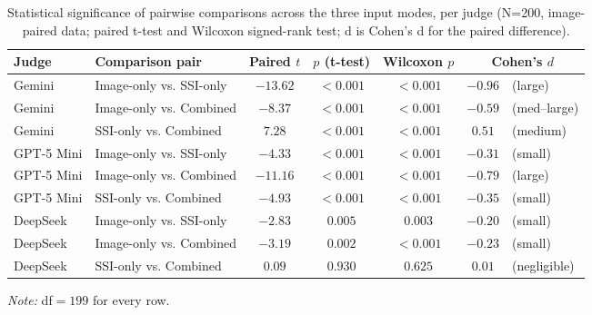 \documentclass[12pt,a4paper]{report}
\begin{document}
\begin{table}[htbp]
    \centering
    \footnotesize
    \caption[Statistical significance of pairwise comparisons across the three input modes]{Statistical significance of pairwise comparisons across the three input modes, per judge (N=200, image-paired data; paired t-test and Wilcoxon signed-rank test; d is Cohen's d for the paired difference).}
    \label{tab:4.6}
    \begin{tabular}{@{}llccccl@{}}
        \toprule
        \textbf{Judge} & \textbf{Comparison pair} & \textbf{Paired $t$} & \textbf{$p$ (t-test)} & \textbf{Wilcoxon $p$} & \multicolumn{2}{c}{\textbf{Cohen's $d$}} \\
        \midrule
        Gemini      & Image-only vs. SSI-only         & $-13.62$ & $<0.001$ & $<0.001$ & $-0.96$ & (large) \\
        Gemini      & Image-only vs. Combined   & $-8.37$  & $<0.001$ & $<0.001$ & $-0.59$ & (med--large) \\
        Gemini      & SSI-only vs. Combined    & $7.28$   & $<0.001$ & $<0.001$ & $0.51$  & (medium) \\
        GPT-5 Mini  & Image-only vs. SSI-only         & $-4.33$  & $<0.001$ & $<0.001$ & $-0.31$ & (small) \\
        GPT-5 Mini  & Image-only vs. Combined   & $-11.16$ & $<0.001$ & $<0.001$ & $-0.79$ & (large) \\
        GPT-5 Mini  & SSI-only vs. Combined    & $-4.93$  & $<0.001$ & $<0.001$ & $-0.35$ & (small) \\
        DeepSeek    & Image-only vs. SSI-only         & $-2.83$  & $0.005$  & $0.003$  & $-0.20$ & (small) \\
        DeepSeek    & Image-only vs. Combined   & $-3.19$  & $0.002$  & $<0.001$ & $-0.23$ & (small) \\
        DeepSeek    & SSI-only vs. Combined    & $0.09$   & $0.930$  & $0.625$  & $0.01$  & (negligible) \\
        \bottomrule
    \end{tabular}
    \par\vspace{2pt}\footnotesize\textit{Note:} df$=199$ for every row.
\end{table}
\end{document}
